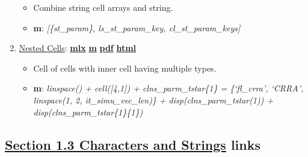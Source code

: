 \documentclass[
]{book}
\providecommand{\tightlist}{%
  \setlength{\itemsep}{0pt}\setlength{\parskip}{0pt}}
\begin{document}
\begin{enumerate}
  \begin{itemize}
  \tightlist
  \item
    Combine string cell arrays and string.
  \item
    \textbf{m}: \emph{{[}\{st\_param\}, ls\_st\_param\_key, cl\_st\_param\_keys{]}}
  \end{itemize}
\item
  \href{https://fanwangecon.github.io/M4Econ/amto/cell/htmlpdfm/fs_cellsnested.html}{Nested Cells}: \href{https://github.com/FanWangEcon/M4Econ/blob/master/amto/cell/fs_cellsnested.mlx}{\textbf{mlx}} \textbar{} \href{https://github.com/FanWangEcon/M4Econ/blob/master/amto/cell/htmlpdfm/fs_cellsnested.m}{\textbf{m}} \textbar{} \href{https://github.com/FanWangEcon/M4Econ/blob/master/amto/cell/htmlpdfm/fs_cellsnested.pdf}{\textbf{pdf}} \textbar{} \href{https://fanwangecon.github.io/M4Econ/amto/cell/htmlpdfm/fs_cellsnested.html}{\textbf{html}}

  \begin{itemize}
  \tightlist
  \item
    Cell of cells with inner cell having multiple types.
  \item
    \textbf{m}: \emph{linspace() + cell({[}4,1{]}) + clns\_parm\_tstar\{1\} = \{`fl\_crra', `CRRA', linspace(1, 2, it\_simu\_vec\_len)\} + disp(clns\_parm\_tstar(1)) + disp(clns\_parm\_tstar\{1\}\{1\})}
  \end{itemize}
\end{enumerate}

\hypertarget{section-1.3-characters-and-stringscharacters-and-strings-links}{%
\subsection{\texorpdfstring{\protect\hyperlink{characters-and-strings}{Section 1.3 Characters and Strings} links}{Section 1.3 Characters and Strings links}}\label{section-1.3-characters-and-stringscharacters-and-strings-links}}
\end{document}
